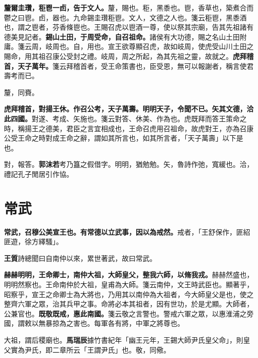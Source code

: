 \textbf{釐爾圭瓚，秬鬯一卣，告于文人。}{\footnotesize 釐，賜也。秬，黑黍也。鬯，香草也，築煮合而鬱之曰鬯。卣，器也。九命錫圭瓚秬鬯。文人，文德之人也。箋云秬鬯，黑黍酒也，謂之鬯者，芬香條鬯也。王賜召虎以鬯酒一尊，使以祭其宗廟，告其先祖諸有德美見記者。}\textbf{錫山土田，于周受命，自召祖命。}{\footnotesize 諸侯有大功德，賜之名山土田附庸。箋云周，岐周也。自，用也。宣王欲尊顯召虎，故如岐周，使虎受山川土田之賜命，用其祖召康公受封之禮。岐周，周之所起，為其先祖之靈，故就之。}\textbf{虎拜稽首，天子萬年。}{\footnotesize 箋云拜稽首者，受王命策書也，臣受恩，無可以報謝者，稱言使君壽考而已。}

\begin{quoting}釐，同賚。\end{quoting}

\textbf{虎拜稽首，對揚王休。作召公考，天子萬壽。明明天子，令聞不已。矢其文德，洽此四國。}{\footnotesize 對遂、考成、矢施也。箋云對答、休美、作為也。虎既拜而答王策命之時，稱揚王之德美，君臣之言宜相成也，王命召虎用召祖命，故虎對王，亦為召康公受王命之時對成王命之辭，謂如其所言也，如其所言者，「天子萬壽」以下是也。}

\begin{quoting}對，報答。\textbf{郭沫若}考乃簋之假借字。明明，猶勉勉。矢，魯詩作弛，寬緩也。洽，禮記孔子閒居引作協。\end{quoting}

\section{常武}


\textbf{常武，召穆公美宣王也。有常德以立武事，因以為戒然。}{\footnotesize 戒者，「王舒保作，匪紹匪遊，徐方繹騷」。}

\begin{quoting}\textbf{王質}詩總聞曰自南仲以來，累世著武，故曰常武。\end{quoting}

\textbf{赫赫明明，王命卿士，南仲大祖，大師皇父，整我六師，以脩我戎。}{\footnotesize 赫赫然盛也，明明然察也。王命南仲於大祖，皇甫為大師。箋云南仲，文王時武臣也。顯著乎，昭察乎，宣王之命卿士為大將也，乃用其以南仲為大祖者，今大師皇父是也，使之整齊六軍之眾，治其兵甲之事。命將必本其祖者，因有世功，於是尤顯。大師者，公兼官也。}\textbf{既敬既戒，惠此南國。}{\footnotesize 箋云敬之言警也。警戒六軍之眾，以惠淮浦之旁國，謂敕以無暴掠為之害也。每軍各有將，中軍之將尊也。}

\begin{quoting}大祖，謂后稷廟也。\textbf{馬瑞辰}據竹書紀年「幽王元年，王錫大師尹氏皇父命」，則皇父實為尹氏，即二章所云「王謂尹氏」也。敬，同儆。\end{quoting}

